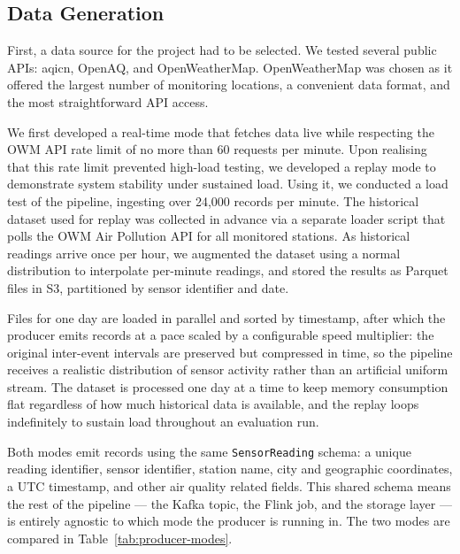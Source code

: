 \subsection{Data Generation}
First, a data source for the project had to be selected. We tested several public APIs: aqicn, OpenAQ, and OpenWeatherMap. OpenWeatherMap was chosen as it offered the largest number of monitoring locations, a convenient data format, and the most straightforward API access.

We first developed a real-time mode that fetches data live while respecting the OWM API rate limit of no more than 60 requests per minute. Upon realising that this rate limit prevented high-load testing, we developed a replay mode to demonstrate system stability under sustained load. Using it, we conducted a load test of the pipeline, ingesting over 24,000 records per minute. The historical dataset used for replay was collected in advance via a separate loader script that polls the OWM Air Pollution API for all monitored stations. As historical readings arrive once per hour, we augmented the dataset using a normal distribution to interpolate per-minute readings, and stored the results as Parquet files in S3, partitioned by sensor identifier and date.

 Files for one day are loaded in parallel and sorted by timestamp, after which the producer emits records at a pace scaled by a configurable speed multiplier: the original inter-event intervals are preserved but compressed in time, so the pipeline receives a realistic distribution of sensor activity rather than an artificial uniform stream. The dataset is processed one day at a time to keep memory consumption flat regardless of how much historical data is available, and the replay loops indefinitely to sustain load throughout an evaluation run.

Both modes emit records using the same \texttt{SensorReading} schema: a unique reading identifier, sensor identifier, station name, city and geographic coordinates, a UTC timestamp, and other air quality related fields. This shared schema means the rest of the pipeline — the Kafka topic, the Flink job, and the storage layer — is entirely agnostic to which mode the producer is running in. The two modes are compared in Table~\ref{tab:producer-modes}.

